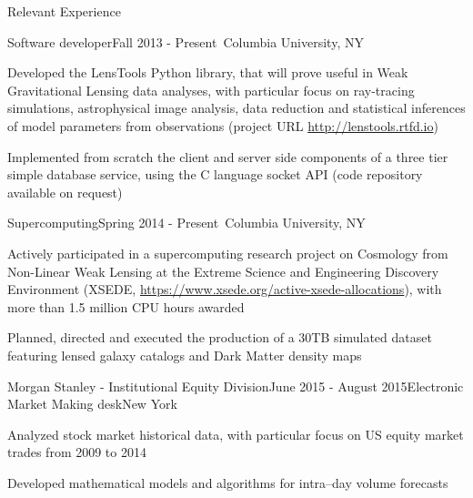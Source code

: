 \documentclass{resume} %
\begin{document}
\begin{rSection}{Relevant Experience}

\begin{rSubsection}{Software developer}{Fall 2013 - Present}{\textcolor{white}{a}}{Columbia University, NY}
\item Developed the LensTools Python library, that will prove useful in Weak Gravitational Lensing data analyses, with particular focus on ray-tracing simulations, astrophysical image analysis, data reduction and statistical inferences of model parameters from observations (project URL \url{http://lenstools.rtfd.io})
\item Implemented from scratch the client and server side components of a three tier simple database service, using the C language socket API (code repository available on request)
\end{rSubsection}

\begin{rSubsection}{Supercomputing}{Spring 2014 - Present}{\textcolor{white}{a}}{Columbia University, NY}
\item Actively participated in a supercomputing research project on Cosmology from Non-Linear Weak Lensing at the Extreme Science and Engineering Discovery Environment (XSEDE, \url{https://www.xsede.org/active-xsede-allocations}), with more than 1.5 million CPU hours awarded
\item Planned, directed and executed the production of a 30TB simulated dataset featuring lensed galaxy catalogs and Dark Matter density maps 
\end{rSubsection}

\begin{rSubsection}{Morgan Stanley - Institutional Equity Division}{June 2015 - August 2015}{Electronic Market Making desk}{New York}
\item Analyzed stock market historical data, with particular focus on US equity market trades from 2009 to 2014
\item Developed mathematical models and algorithms for intra--day volume forecasts 
\end{rSubsection}

\end{rSection}

\end{document}
